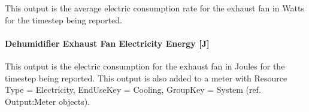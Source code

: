 This output is the average electric consumption rate for the exhaust fan in Watts for the timestep being reported.

\paragraph{Dehumidifier Exhaust Fan Electricity Energy {[}J{]}}\label{dehumidifier-exhaust-fan-electric-energy-j}

This output is the electric consumption for the exhaust fan in Joules for the timestep being reported. This output is also added to a meter with Resource Type = Electricity, EndUseKey = Cooling, GroupKey = System (ref. Output:Meter objects).
